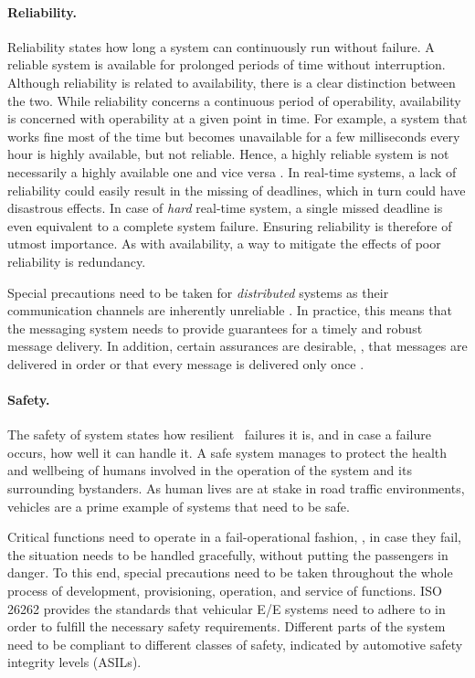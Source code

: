\paragraph{Reliability.}
Reliability states how long a system can continuously run without failure. A reliable system is available for prolonged periods of time without interruption. Although reliability is related to availability, there is a clear distinction between the two. While reliability concerns a continuous period of operability, availability is concerned with operability at a given point in time. For example, a system that works fine most of the time but becomes unavailable for a few milliseconds every hour is highly available, but not reliable. Hence, a highly reliable system is not necessarily a highly available one and vice versa \cite{tanenbaum2017distributed}. In real-time systems, a lack of reliability could easily result in the missing of deadlines, which in turn could have disastrous effects. In case of \emph{hard} real-time system, a single missed deadline is even equivalent to a complete system failure. Ensuring reliability is therefore of utmost importance. As with availability, a way to mitigate the effects of poor reliability is redundancy.

Special precautions need to be taken for \emph{distributed} systems as their communication channels are inherently unreliable \cite{tanenbaum2017distributed}. In practice, this means that the messaging system needs to provide guarantees for a timely and robust message delivery. In addition, certain assurances are desirable, \eg , that messages are delivered in order or that every message is delivered only once \cite{o2007quality}.

\paragraph{Safety.}
The safety of system states how resilient \wrt\ failures it is, and in case a failure occurs, how well it can handle it. A safe system manages to protect the health and wellbeing of humans involved in the operation of the system and its surrounding bystanders.
As human lives are at stake in road traffic environments, vehicles are a prime example of systems that need to be safe.

Critical functions need to operate in a fail-operational fashion, \ie , in case they fail, the situation needs to be handled gracefully, without putting the passengers in danger. To this end, special precautions need to be taken throughout the whole process of development, provisioning, operation, and service of functions. ISO 26262 \cite{iso201126262} provides the standards that vehicular E/E systems need to adhere to in order to fulfill the necessary safety requirements. Different parts of the system need to be compliant to different classes of safety, indicated by automotive safety integrity levels (ASILs).

